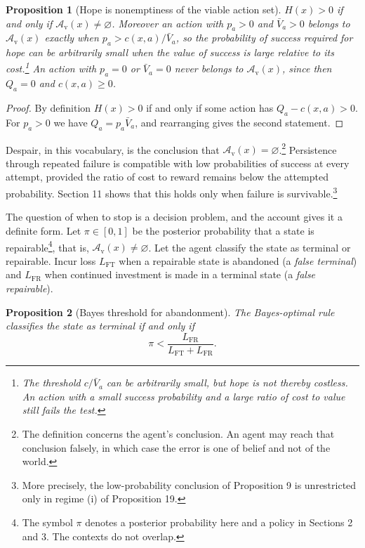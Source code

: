 \documentclass[11pt]{article}
\newtheorem{proposition}{Proposition}
\theoremstyle{remark}
\begin{document}
\begin{proposition}[Hope is nonemptiness of the viable action set]
$H(x)>0$ if and only if $\mathcal A_{\mathrm v}(x)\neq\varnothing$. Moreover an action with $p_a>0$ and $\bar V_a>0$ belongs to $\mathcal A_{\mathrm v}(x)$ exactly when $p_a>c(x,a)/\bar V_a$, so the probability of success required for hope can be arbitrarily small when the value of success is large relative to its cost.\footnote{The threshold $c/\bar V_a$ can be arbitrarily small, but hope is not thereby costless. An action with a small success probability and a large ratio of cost to value still fails the test.} An action with $p_a=0$ or $\bar V_a=0$ never belongs to $\mathcal A_{\mathrm v}(x)$, since then $Q_a=0$ and $c(x,a)\ge0$.
\end{proposition}

\begin{proof}
By definition $H(x)>0$ if and only if some action has $Q_a-c(x,a)>0$. For $p_a>0$ we have $Q_a=p_a\bar V_a$, and rearranging gives the second statement.
\end{proof}

Despair, in this vocabulary, is the conclusion that $\mathcal A_{\mathrm v}(x)=\varnothing$.\footnote{The definition concerns the agent's conclusion. An agent may reach that conclusion falsely, in which case the error is one of belief and not of the world.} Persistence through repeated failure is compatible with low probabilities of success at every attempt, provided the ratio of cost to reward remains below the attempted probability. Section 11 shows that this holds only when failure is survivable.\footnote{More precisely, the low-probability conclusion of Proposition 9 is unrestricted only in regime (i) of Proposition 19.}

The question of when to stop is a decision problem, and the account gives it a definite form. Let $\pi\in[0,1]$ be the posterior probability that a state is repairable\footnote{The symbol $\pi$ denotes a posterior probability here and a policy in Sections 2 and 3. The contexts do not overlap.}, that is, $\mathcal A_{\mathrm v}(x)\neq\varnothing$. Let the agent classify the state as terminal or repairable. Incur loss $L_{\mathrm{FT}}$ when a repairable state is abandoned (a \emph{false terminal}) and $L_{\mathrm{FR}}$ when continued investment is made in a terminal state (a \emph{false repairable}).

\begin{proposition}[Bayes threshold for abandonment]
The Bayes-optimal rule classifies the state as terminal if and only if
\[
\pi<\frac{L_{\mathrm{FR}}}{L_{\mathrm{FT}}+L_{\mathrm{FR}}}.
\]
\end{proposition}
\end{document}
